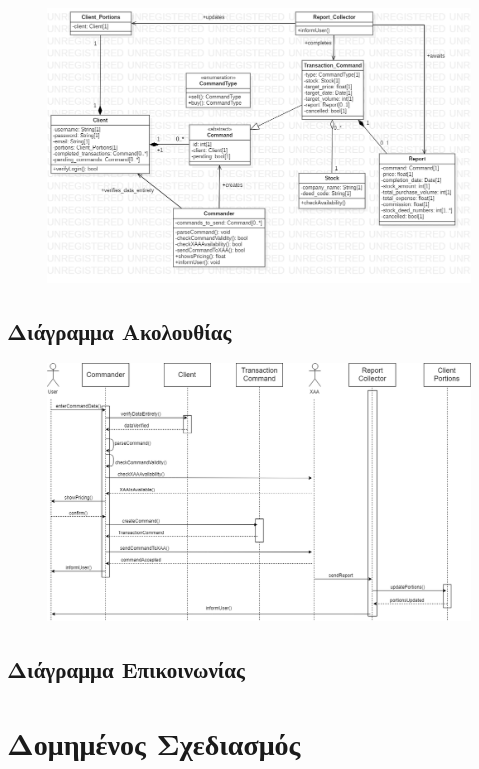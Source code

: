 \documentclass{article}
\begin{document}
\begin{figure}[!h]
	\includegraphics[width=\linewidth]{../UML/command_class_diagram.png}
\end{figure}

\subsection{Διάγραμμα Ακολουθίας}

\begin{figure}[!h]
	\includegraphics[width=14cm]{../UML/sequence_diagram.png}
\end{figure}

\newpage
\subsection{Διάγραμμα Επικοινωνίας}


\newpage
\section{Δομημένος Σχεδιασμός}
\end{document}
